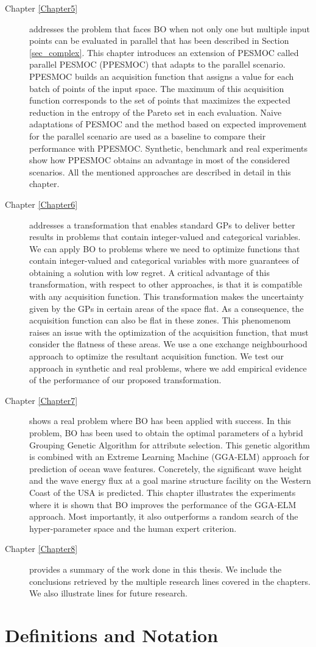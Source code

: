 \begin{description}
\item [{ Chapter \ref{Chapter5}}] addresses the problem that faces BO when not only one but multiple input points can be evaluated in parallel that has been described in Section \ref{sec_complex}. This chapter introduces an extension of PESMOC called parallel PESMOC (PPESMOC) that adapts to the parallel scenario. PPESMOC builds an acquisition function that assigns a value for each batch of points of the input space. The maximum of this acquisition function corresponds to the set of points that maximizes the expected reduction in the entropy of the Pareto set in each evaluation. Naive adaptations of PESMOC and the method based on expected improvement for the parallel scenario are used as a baseline to compare their performance with PPESMOC. Synthetic, benchmark and real experiments show how PPESMOC obtains an advantage in most of the considered scenarios. All the mentioned approaches are described in detail in this chapter. 

\item [{ Chapter \ref{Chapter6}}] addresses a transformation that enables standard GPs to deliver better results in problems that contain integer-valued and categorical variables. We can apply BO to problems where we need to optimize functions that contain integer-valued and categorical variables with more guarantees of obtaining a solution with low regret. A critical advantage of this transformation, with respect to other approaches, is that it is compatible with any acquisition function. This transformation makes the uncertainty given by the GPs in certain areas of the space flat. As a consequence, the acquisition function can also be flat in these zones. This phenomenom raises an issue with the optimization of the acquisition function, that must consider the flatness of these areas. We use a one exchange neighbourhood approach to optimize the resultant acquisition function. We test our approach in synthetic and real problems, where we add empirical evidence of the performance of our proposed transformation. 

\item[{Chapter \ref{Chapter7}}] shows a real problem where BO has been applied with success. In this problem, BO has been used to obtain the optimal parameters of a hybrid Grouping Genetic Algorithm for attribute selection. This genetic algorithm is combined with an Extreme Learning Machine (GGA-ELM) approach for prediction of ocean wave features. Concretely, the significant wave height and the wave energy flux at a goal marine structure facility on the Western Coast of the USA is predicted. This chapter illustrates the experiments where it is shown that BO improves the performance of the GGA-ELM approach. Most importantly, it also outperforms a random search of the hyper-parameter space and the human expert criterion. 

\item [{Chapter \ref{Chapter8}}] provides a summary of the work done in this thesis. We include the conclusions retrieved by the multiple research lines covered in the chapters. We also illustrate lines for future research.

\end{description}

\section{Definitions and Notation}

